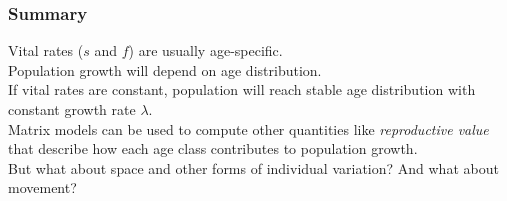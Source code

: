 \documentclass[color=usenames,dvipsnames]{beamer}\usepackage[]{graphicx}\usepackage[]{color}
\begin{document}











\begin{frame}
  \frametitle{Summary}
  Vital rates ($s$ and $f$) are usually age-specific. \\
  \pause
  \vfill
  Population growth will depend on age distribution. \\
  \pause
  \vfill
  If vital rates are constant, population will reach stable
  age distribution with constant growth rate $\lambda$. \\
  \pause
  \vfill
  Matrix models can be used to compute other quantities like
  \emph{reproductive value} that describe how each age class
  contributes to population growth. \\
  \pause
  \vfill
  But what about space and other forms of individual variation? And
  what about movement?
\end{frame}



    
    
\end{document}
